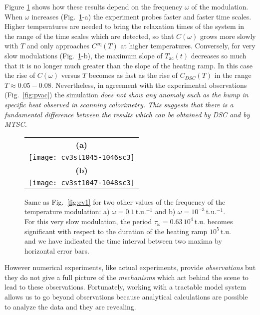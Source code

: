 \documentclass[pre,a4paper,twocolumn,superscriptaddress,%
floatfix]{revtex4}
\newcommand{\tac}{\ensuremath{T_{\mathrm{ac}}}}
\begin{document}
Figure \ref{fig:cv2} shows how these results depend on the frequency $\omega$
of the modulation. When $\omega$ increases (Fig.~\mbox{\ref{fig:cv2}-a})
the experiment probes faster and
faster time scales. Higher temperatures are needed to bring the relaxation
times of the system in the range of the time scales which are detected, so
that $C(\omega)$ grows more slowly with $T$ and only approaches
$C^{\mathrm{eq}}(T)$ at higher temperatures. Conversely, for very slow
modulations (Fig.~\mbox{\ref{fig:cv2}-b}), the maximum slope of $\tac(t)$
decreases 
so much that it is no longer much greater than the slope of the heating ramp.
In this case the rise of $C(\omega)$ versus $T$ becomes as fast as the
rise of $C_{DSC}(T)$ in the range $T \approx 0.05 - 0.08$. Nevertheless, in
agreement with the experimental observations (Fig.~\ref{fig:pvac}) the
simulation {\em does not show any anomaly such as the hump in specific heat
  observed in scanning calorimetry. This suggests that there is a fundamental
  difference between the results which can be obtained by DSC and by MTSC.}
\begin{figure}[h]
  \centering
  \begin{tabular}{c}
    \textbf{(a)} \\
    \texttt{[image: cv3st1045-1046sc3]} \\
    \textbf{(b)} \\
    \texttt{[image: cv3st1047-1048sc3]}
  \end{tabular}
  \caption{Same as Fig.~\ref{fig:cv1} for two other values of the frequency of
    the temperature modulation:
    a) $\omega = 0.1\,$t.u.$^{-1}$ and b) $\omega = 10^{-3}\,$t.u.$^{-1}$.
  For this very slow modulation, the period  $\tau_{\omega} =
  0.63\,10^4\,$t.u. becomes significant with respect to the duration of the
  heating 
  ramp $10^5\,$t.u. and we have indicated the time interval between two maxima
  by horizontal error bars.}
  \label{fig:cv2}
\end{figure}

\medskip
However numerical experiments, like actual experiments, provide {\em
  observations} but they do not give a full picture of the {\em mechanisms}
which act behind the scene to lead to these observations. Fortunately, working
with a tractable model system allows us to go beyond observations because
analytical calculations are possible to analyze the data and they are
revealing.
\end{document}

